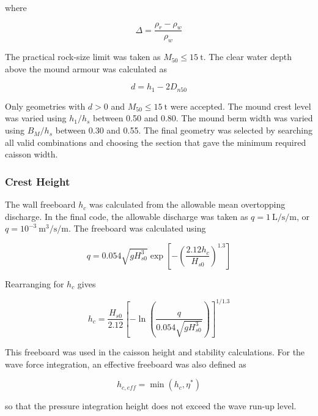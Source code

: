 \documentclass[a4paper, 11pt]{article}
\begin{document}
where

\begin{equation}
    \Delta=\frac{\rho_r-\rho_w}{\rho_w}
\end{equation}

The practical rock-size limit was taken as \(M_{50}\leq15~\mathrm{t}\). The clear water depth above the mound armour was calculated as

\begin{equation}
    d=h_1-2D_{n50}
\end{equation}

Only geometries with \(d>0\) and \(M_{50}\leq15~\mathrm{t}\) were accepted. The mound crest level was varied using \(h_1/h_s\) between 0.50 and 0.80. The mound berm width was varied using \(B_M/h_s\) between 0.30 and 0.55. The final geometry was selected by searching all valid combinations and choosing the section that gave the minimum required caisson width.

\subsubsection{Crest Height}

\hspace*{0.5cm} The wall freeboard \(h_c\) was calculated from the allowable mean overtopping discharge. In the final code, the allowable discharge was taken as \(q=1~\mathrm{L/s/m}\), or \(q=10^{-3}~\mathrm{m^3/s/m}\). The freeboard was calculated using

\begin{equation}
    q=
    0.054\sqrt{gH_{s0}^{3}}
    \exp\left[
    -\left(
    \frac{2.12h_c}{H_{s0}}
    \right)^{1.3}
    \right]
\end{equation}

Rearranging for \(h_c\) gives

\begin{equation}
    h_c=
    \frac{H_{s0}}{2.12}
    \left[
    -\ln\left(
    \frac{q}{0.054\sqrt{gH_{s0}^{3}}}
    \right)
    \right]^{1/1.3}
\end{equation}

This freeboard was used in the caisson height and stability calculations. For the wave force integration, an effective freeboard was also defined as

\begin{equation}
    h_{c,eff}=\min(h_c,\eta^*)
\end{equation}

so that the pressure integration height does not exceed the wave run-up level.
\end{document}
